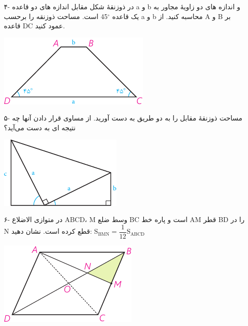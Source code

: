 \documentclass[12pt, a4paper]{book}
\newenvironment{Figure}
{\par\medskip\noindent\minipage{\linewidth}}
{\endminipage\par\medskip}
\begin{document}
\begin{multicols}{2}
\bigskip
{\medium ۴-}
در ذوزنقهٔ شکل مقابل اندازه های دو قاعده a و b و اندازه های دو زاویهٔ مجاور به یک قاعده 
$^{\circ}$45
 است. مساحت ذوزنقه را برحسب a و b محاسبه کنید. از A و B بر قاعده DC عمود کنید.

\begin{Figure}
	\centering
	\includegraphics[scale=1.2]{"Shapes/Fasl - 3/Dars 2/P72-S3.pdf"}
\end{Figure}


\bigskip
{\medium ۵-}
مساحت ذوزنقهٔ مقابل را به دو طریق به دست آورید. از مساوی قرار دادن آنها چه نتیجه ای به دست می‌آید؟

\begin{Figure}
	\centering
	\includegraphics[scale=1.2]{"Shapes/Fasl - 3/Dars 2/P72-S4.pdf"}
\end{Figure}


\bigskip
{\medium ۶-}
در متوازی الاضلاع ABCD، M وسط ضلع BC است و پاره خط AM قطر BD را در N قطع کرده است. نشان دهید: \hfill
	$
\mathrm{S}_{\mathrm{BMN}} = \dfrac{1}{12} \mathrm{S}_{\mathrm{ABCD}}
	$


\begin{Figure}
	\centering
	\includegraphics[scale=1.2]{"Shapes/Fasl - 3/Dars 2/P72-S5.pdf"}
\end{Figure}



\end{multicols}
\end{document}
